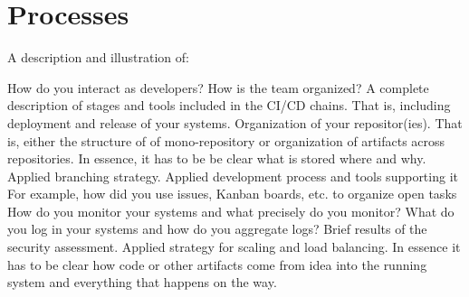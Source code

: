 \section{Processes}

A description and illustration of:

How do you interact as developers?
How is the team organized?
A complete description of stages and tools included in the CI/CD chains.
That is, including deployment and release of your systems.
Organization of your repositor(ies).
That is, either the structure of of mono-repository or organization of artifacts across repositories.
In essence, it has to be be clear what is stored where and why.
Applied branching strategy.
Applied development process and tools supporting it
For example, how did you use issues, Kanban boards, etc. to organize open tasks
How do you monitor your systems and what precisely do you monitor?
What do you log in your systems and how do you aggregate logs?
Brief results of the security assessment.
Applied strategy for scaling and load balancing.
In essence it has to be clear how code or other artifacts come from idea into the running system and everything that happens on the way.